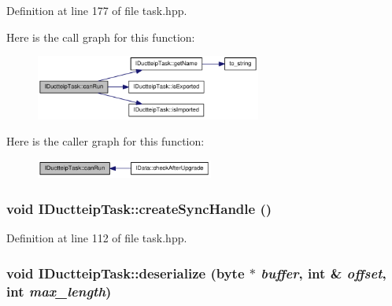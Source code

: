 Definition at line 177 of file task.hpp.

Here is the call graph for this function:\nopagebreak
\begin{figure}[H]
\begin{center}
\leavevmode
\includegraphics[width=210pt]{class_i_ductteip_task_ad30ebd78861e6d0e7647a79393ccbcab_cgraph}
\end{center}
\end{figure}


Here is the caller graph for this function:\nopagebreak
\begin{figure}[H]
\begin{center}
\leavevmode
\includegraphics[width=165pt]{class_i_ductteip_task_ad30ebd78861e6d0e7647a79393ccbcab_icgraph}
\end{center}
\end{figure}
\hypertarget{class_i_ductteip_task_aac8c7bc01da3981e2080293b4337f576}{
\subsubsection[{createSyncHandle}]{\setlength{\rightskip}{0pt plus 5cm}void IDuctteipTask::createSyncHandle ()}}
\label{class_i_ductteip_task_aac8c7bc01da3981e2080293b4337f576}


Definition at line 112 of file task.hpp.\hypertarget{class_i_ductteip_task_a035d61635b69e2682c7361e3a07f610e}{
\subsubsection[{deserialize}]{\setlength{\rightskip}{0pt plus 5cm}void IDuctteipTask::deserialize ({\bf byte} $\ast$ {\em buffer}, \/  int \& {\em offset}, \/  int {\em max\_\-length})}}
\label{class_i_ductteip_task_a035d61635b69e2682c7361e3a07f610e}


